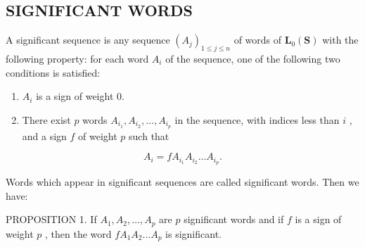 \subsection{SIGNIFICANT WORDS}

A significant sequence is any sequence \((A_{j})_{1\leqslant j\leqslant n}\) of words of \(\mathbf{L}_{0}(\mathbf{S})\) with the following property: for each word \(A_{i}\) of the sequence, one of the following two conditions is satisfied:

\begin{enumerate}
\def\labelenumi{(\arabic{enumi})}
\item
  \(A_{i}\) is a sign of weight 0.
\item
  There exist \(p\) words \(A_{i_1}, A_{i_2}, \ldots, A_{i_p}\) in the sequence, with indices less than \(i\) , and a sign \(f\) of weight \(p\) such that
\end{enumerate}

\[
A _ {i} = f A _ {i _ {1}} A _ {i _ {2}} \dots A _ {i _ {p}}.
\]

Words which appear in significant sequences are called significant words. Then we have:

PROPOSITION 1. If \(A_1, A_2, \ldots, A_p\) are \(p\) significant words and if \(f\) is a sign of weight \(p\) , then the word \(fA_1A_2 \ldots A_p\) is significant.

